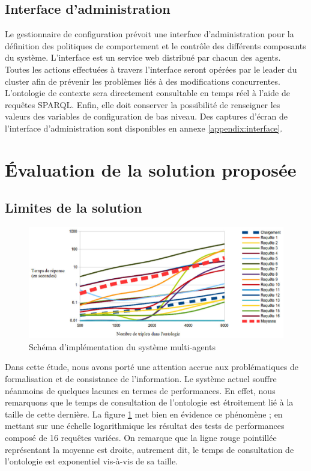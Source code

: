 \subsection{Interface d'administration}

Le gestionnaire de configuration prévoit une interface d'administration
pour la définition des politiques de comportement et le contrôle des différents
composants du système. L'interface est un service web distribué par
chacun des agents. Toutes les actions effectuées à travers l'interface seront
opérées par le leader du cluster afin de prévenir les problèmes liés à des
modifications concurrentes. L'ontologie de contexte sera directement
consultable en temps réel à l'aide de requêtes SPARQL. Enfin, elle doit
conserver la possibilité de renseigner les valeurs des variables de
configuration de bas niveau. Des captures d'écran de l'interface
d'administration sont disponibles en annexe \ref{appendix:interface}.

\section{Évaluation de la solution proposée}

\subsection{Limites de la solution}

\begin{figure}[H]
    \centering
    \includegraphics[width=\textwidth]{img/chart_sparql}
    \caption{Schéma d'implémentation du système multi-agents}
    \label{fig:chart}
\end{figure}

Dans cette étude, nous avons porté une attention accrue aux problématiques de
formalisation et de consistance de l'information. Le système actuel souffre
néanmoins de quelques lacunes en termes de performances. En effet, nous
remarquons que le temps de consultation de l'ontologie est étroitement lié à
la taille de cette dernière. La figure \ref{fig:chart} met bien en évidence ce
phénomène ; en mettant sur une échelle logarithmique les résultat des tests de
performances composé de 16 requêtes variées. On remarque que la ligne
rouge pointillée représentant la moyenne est droite, autrement dit, le temps de
consultation de l'ontologie est exponentiel vis-à-vis de sa taille.

